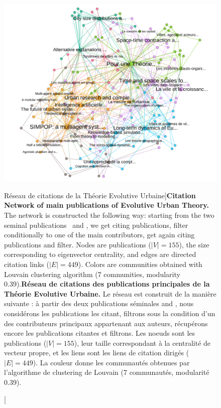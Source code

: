 \begin{figure}[h!]
\includegraphics[width=\linewidth]{Figures/KnowledgeFramework/core}
\caption[Citation Network of main publications of Evolutive Urban Theory][Réseau de citations de la Théorie Evolutive Urbaine]{\textbf{Citation Network of main publications of Evolutive Urban Theory.} The network is constructed the following way: starting from the two seminal publications~\cite{pumain1997pour} and \cite{sanders1997simpop}, we get citing publications, filter conditionally to one of the main contributors, get again citing publications and filter. Nodes are publications ($\left|V\right|=155$), the size corresponding to eigenvector centrality, and edges are directed citation links ($\left|E\right|=449$). Colors are communities obtained with Louvain clustering algorithm (7 communities, modularity 0.39).\label{fig:knowledgeframework:citnw}}{\textbf{Réseau de citations des publications principales de la Théorie Evolutive Urbaine.} Le réseau est construit de la manière suivante : à partir des deux publications séminales \cite{pumain1997pour} and \cite{sanders1997simpop}, nous considérons les publications les citant, filtrons sous la condition d'un des contributeurs principaux appartenant aux auteurs, récupérons encore les publications citantes et filtrons. Les noeuds sont les publications ($\left|V\right|=155$), leur taille correspondant à la centralité de vecteur propre, et les liens sont les liens de citation dirigés ($\left|E\right|=449$). La couleur donne les communautés obtenues par l'algorithme de clustering de Louvain (7 communautés, modularité 0.39).\label{fig:knowledgeframework:citnw}}
\end{figure}




